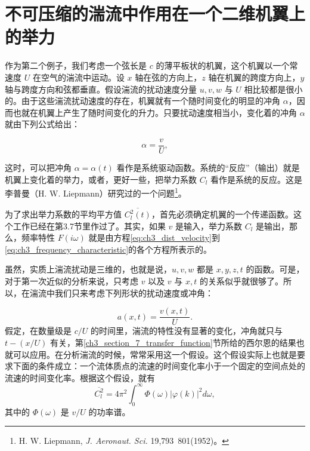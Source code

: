 \section{不可压缩的湍流中作用在一个二维机翼上的举力}

作为第二个例子，我们考虑一个弦长是 $c$ 的薄平板状的机翼，这个机翼以一个常速度 $U$ 在空气的湍流中运动。设 $x$ 轴在弦的方向上，$z$ 轴在机翼的跨度方向上，$y$ 轴与跨度方向和弦都垂直。假设湍流的扰动速度分量 $u, v, w$ 与 $U$ 相比较都是很小的。由于这些湍流扰动速度的存在，机翼就有一个随时间变化的明显的冲角 $\alpha$，因而也就在机翼上产生了随时间变化的升力。只要扰动速度相当小，变化着的冲角 $\alpha$ 就由下列公式给出：

\begin{equation*}
\alpha = \frac{v}{U},
\end{equation*}

这时，可以把冲角 $\alpha = \alpha(t)$ 看作是系统驱动函数。系统的“反应”（输出）就是机翼上变化着的举力，或者，更好一些，把举力系数 $C_l$ 看作是系统的反应。这是李普曼（H. W. Liepmann）研究过的一个问题\footnote{H. W. Liepmann, \emph{J. Aeronaut. Sci.} 19,793~801(1952)。}。

为了求出举力系数的平均平方值 $\overline{C_l^2(t)}$，首先必须确定机翼的一个传递函数。这个工作已经在第3.7节里作过了。其实，如果 $v$ 是输入，举力系数 $C_l$ 是输出，那么，频率特性 $F(i\omega)$ 就是由方程\eqref{eq:ch3_dist_velocity}到\eqref{eq:ch3_frequency_characteristic}的各个方程所表示的。

虽然，实质上湍流扰动是三维的，也就是说，$u, v, w$ 都是 $x, y, z, t$ 的函数。可是，对于第一次近似的分析来说，只考虑 $v$ 以及 $v$ 与 $x, t$ 的关系似乎就很够了。所以，在湍流中我们只来考虑下列形状的扰动速度或冲角：

\begin{equation*}
a(x,t) = \frac{v(x,t)}{U}.
\end{equation*}
假定，在数量级是 $c/U$ 的时间里，湍流的特性没有显著的变化，冲角就只与 $t - (x/U)$ 有关，第\ref{ch3_section_7_transfer_function}节所给的西尔恩的结果也就可以应用。在分析湍流的时候，常常采用这一个假设。这个假设实际上也就是要求下面的条件成立：一个流体质点的流速的时间变化率小于一个固定的空间点处的流速的时间变化率。根据这个假设，就有
\begin{equation}
\overline{C_l^2} = 4\pi^2 \int_0^\infty \Phi(\omega) |\varphi(k)|^2 d\omega,
\end{equation}
其中的 $\Phi(\omega)$ 是 $v/U$ 的功率谱。


